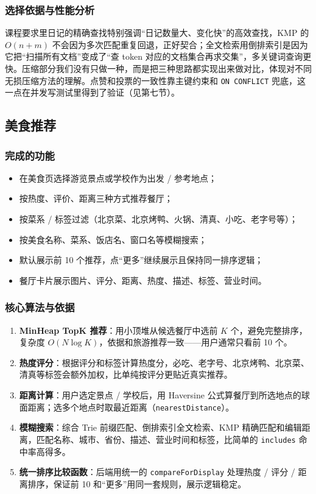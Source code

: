 \documentclass[UTF8,a4paper,12pt]{ctexart}
\begin{document}
\subsubsection{选择依据与性能分析}
课程要求里日记的精确查找特别强调“日记数量大、变化快”的高效查找，KMP 的 $O(n+m)$ 不会因为多次匹配重复回退，正好契合；全文检索用倒排索引是因为它把“扫描所有文档”变成了“查 token 对应的文档集合再求交集”，多关键词查询更快。压缩部分我们没有只做一种，而是把三种思路都实现出来做对比，体现对不同无损压缩方法的理解。点赞和投票的一致性靠主键约束和 \texttt{ON CONFLICT} 兜底，这一点在并发写测试里得到了验证（见第七节）。

\subsection{美食推荐}

\subsubsection{完成的功能}
\begin{itemize}
\item 在美食页选择游览景点或学校作为出发 / 参考地点；
\item 按热度、评价、距离三种方式推荐餐厅；
\item 按菜系 / 标签过滤（北京菜、北京烤鸭、火锅、清真、小吃、老字号等）；
\item 按美食名称、菜系、饭店名、窗口名等模糊搜索；
\item 默认展示前 10 个推荐，点“更多”继续展示且保持同一排序逻辑；
\item 餐厅卡片展示图片、评分、距离、热度、描述、标签、营业时间。
\end{itemize}

\subsubsection{核心算法与依据}
\begin{enumerate}
\item \textbf{MinHeap TopK 推荐}：用小顶堆从候选餐厅中选前 $K$ 个，避免完整排序，复杂度 $O(N\log K)$，依据和旅游推荐一致——用户通常只看前 10 个。
\item \textbf{热度评分}：根据评分和标签计算热度分，必吃、老字号、北京烤鸭、北京菜、清真等标签会额外加权，比单纯按评分更贴近真实推荐。
\item \textbf{距离计算}：用户选定景点 / 学校后，用 Haversine 公式算餐厅到所选地点的球面距离；选多个地点时取最近距离（\texttt{nearestDistance}）。
\item \textbf{模糊搜索}：综合 Trie 前缀匹配、倒排索引全文检索、KMP 精确匹配和编辑距离，匹配名称、城市、省份、描述、营业时间和标签，比简单的 \texttt{includes} 命中率高得多。
\item \textbf{统一排序比较函数}：后端用统一的 \texttt{compareForDisplay} 处理热度 / 评分 / 距离排序，保证前 10 和“更多”用同一套规则，展示逻辑稳定。
\end{enumerate}
\end{document}
